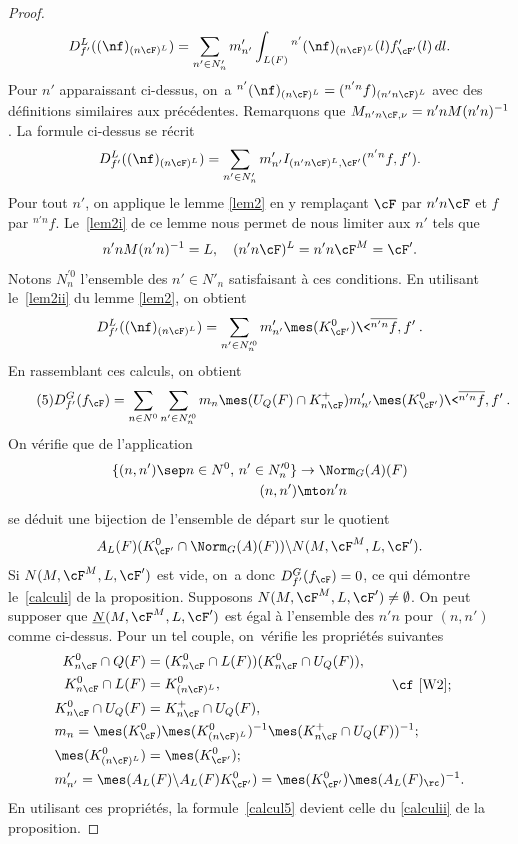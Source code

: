 \begin{proof}
\[
D_{f'}^L((\nf)_{(n\cF)^L})=\sum_{n'\in N'_{n}}m'_{n'}\int_{L(F)}{^{n'}(\nf)_{(n\cF)^L}}(l)f'_{\cF'}(l)\,dl.
\]
Pour $n'$ apparaissant ci-dessus, on~a $^{n'}(\nf)_{(n\cF)^L}=(^{n'n}f)_{(n'n\cF)^L}$ avec des définitions similaires aux précédentes. Remarquons que $M_{n'n\cF,\nu}=n'nM(n'n)^{-1}$. La formule ci-dessus se récrit
\[
D_{f'}^L((\nf)_{(n\cF)^L})=\sum_{n'\in N'_{n}}m'_{n'}I_{(n'n\cF)^L,\cF'}(^{n'n}f,f').
\]
Pour tout $n'$, on applique le lemme \ref{lem2} en y remplaçant $\cF$ par $n'n\cF$ et $f$ par $^{n'n}f$. Le~\eqref{lem2i} de ce lemme nous permet de nous limiter aux $n'$ tels que
\[
n'nM(n'n)^{-1}=L,\quad (n'n\cF)^L=n'n\cF^M=\cF'.
\]
Notons $N_{n}^{\prime0}$ l'ensemble des $n'\in N'_{n}$ satisfaisant à ces conditions. En utilisant le~\eqref{lem2ii} du lemme \ref{lem2}, on obtient
\[
D_{f'}^L((\nf)_{(n\cF)^L})=\sum_{n'\in N^{\prime0}_{n}}m'_{n'}\mes(K_{\cF'}^0)\<\overline{^{n'n}f},f'\>.
\]
En rassemblant ces calculs, on obtient
\begin{equation}\tag{5}\label{calcul5}
D^G_{f'}(f_{\cF})= \sum_{n\in N^0}\sum_{n'\in N_{n}^{\prime0}}m_{n}\mes(U_{Q}(F)\cap K_{n\cF}^+) m'_{n'}\mes(K_{\cF'}^0)\<\overline{^{n'n}f},f'\>.
\end{equation}
On vérifie que de l'application
\begin{align*}
\{(n,n')\sep n\in N^0,\, n'\in N_{n}^{\prime0}\}&\to \Norm_{G}(A)(F)\\ (n,n')&\mto n'n
\end{align*}
se déduit une bijection de l'ensemble de départ sur le quotient
\[
A_{L}(F)(K_{\cF'}^0\cap \Norm_{G}(A)(F))\backslash N(M,\cF^{M},L,\cF') .
\]
Si $N(M,\cF^{M},L,\cF')$ est vide, on~a donc $D^G_{f'}(f_{\cF})=0$, ce qui démontre le~\eqref{calculi} de la proposition. Supposons $N(M,\cF^M,L,\cF')\neq\emptyset$. On peut supposer que $\underline{N}(M,\cF^M,L,\cF')$ est égal à l'ensemble des $n'n$ pour $(n,n')$ comme ci-dessus.
Pour un tel couple, on~vérifie les propriétés suivantes
\begin{align*}
&
\begin{aligned}
K_{n\cF}^0\cap Q(F)&=(K_{n\cF}^0\cap L(F))(K_{n\cF}^0\cap U_{Q}(F)),\\
K_{n\cF}^0\cap L(F)&=K_{(n\cF)^L}^0,\\
K_{n\cF}^0\cap U_{Q}(F)&=K_{n\cF}^+\cap U_{Q}(F),
\end{aligned}
\qquad\text{\cf \cite[Lem.\,6]{W2};}
\\
&m_{n}=\mes(K_{\cF}^0)\mes(K_{(n\cF)^L}^0)^{-1}\mes(K_{n\cF}^+\cap U_{Q}(F))^{-1};
\\
&\mes(K_{(n\cF)^L}^0)=\mes(K_{\cF'}^0);
\\
&m'_{n'}=\mes(A_{L}(F)\backslash A_{L}(F)K_{\cF'}^0)=\mes(K_{\cF'}^0)\mes(A_{L}(F)_{\rc})^{-1}.
\end{align*}
En utilisant ces propriétés, la formule~\eqref{calcul5} devient celle du \eqref{calculii} de la proposition.
\end{proof}


